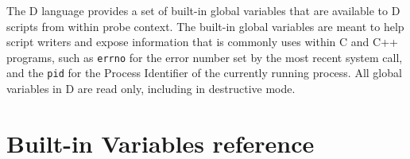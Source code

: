 The D language provides a set of built-in global variables that are
available to D scripts from within probe context.  The built-in global
variables are meant to help script writers and expose information that
is commonly uses within C and C++ programs, such as \verb|errno| for
the error number set by the most recent system call, and the
\verb|pid| for the Process Identifier of the currently running
process.  All global variables in D are read only, including in
destructive mode.

\section{Built-in Variables reference}
\label{sec:builtin-variables-ref}





























